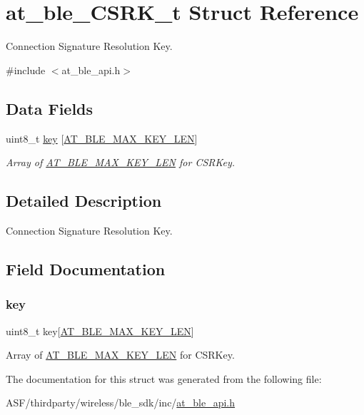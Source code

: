 \hypertarget{structat__ble___c_s_r_k__t}{}\section{at\+\_\+ble\+\_\+\+C\+S\+R\+K\+\_\+t Struct Reference}
\label{structat__ble___c_s_r_k__t}


Connection Signature Resolution Key.  




{\ttfamily \#include $<$at\+\_\+ble\+\_\+api.\+h$>$}

\subsection*{Data Fields}
\begin{DoxyCompactItemize}
\item 
uint8\+\_\+t \mbox{\hyperlink{structat__ble___c_s_r_k__t_abdd5757e31504574b5dc0ee379bced9f}{key}} \mbox{[}\mbox{\hyperlink{at__ble__api_8h_a462eb50567c44d7284308fe058158e99}{A\+T\+\_\+\+B\+L\+E\+\_\+\+M\+A\+X\+\_\+\+K\+E\+Y\+\_\+\+L\+EN}}\mbox{]}
\begin{DoxyCompactList}\small\item\em Array of \mbox{\hyperlink{at__ble__api_8h_a462eb50567c44d7284308fe058158e99}{A\+T\+\_\+\+B\+L\+E\+\_\+\+M\+A\+X\+\_\+\+K\+E\+Y\+\_\+\+L\+EN}} for C\+S\+R\+Key. \end{DoxyCompactList}\end{DoxyCompactItemize}


\subsection{Detailed Description}
Connection Signature Resolution Key. 

\subsection{Field Documentation}
\mbox{\label{structat__ble___c_s_r_k__t_abdd5757e31504574b5dc0ee379bced9f}} 
\subsubsection{\texorpdfstring{key}{key}}
{\footnotesize\ttfamily uint8\+\_\+t key\mbox{[}\mbox{\hyperlink{at__ble__api_8h_a462eb50567c44d7284308fe058158e99}{A\+T\+\_\+\+B\+L\+E\+\_\+\+M\+A\+X\+\_\+\+K\+E\+Y\+\_\+\+L\+EN}}\mbox{]}}



Array of \mbox{\hyperlink{at__ble__api_8h_a462eb50567c44d7284308fe058158e99}{A\+T\+\_\+\+B\+L\+E\+\_\+\+M\+A\+X\+\_\+\+K\+E\+Y\+\_\+\+L\+EN}} for C\+S\+R\+Key. 



The documentation for this struct was generated from the following file\+:\begin{DoxyCompactItemize}
\item 
A\+S\+F/thirdparty/wireless/ble\+\_\+sdk/inc/\mbox{\hyperlink{at__ble__api_8h}{at\+\_\+ble\+\_\+api.\+h}}\end{DoxyCompactItemize}
